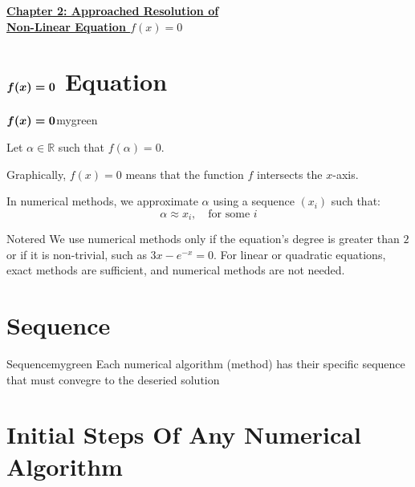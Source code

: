\newpage
\null

\begin{center}
    \Huge{\textbf{\underline{Chapter 2: Approached Resolution of}}} \\
    \vspace{0.25cm}
    \Huge{\textbf{\underline{Non-Linear Equation \( f(x) = 0 \)}}}
\end{center}

\setcounter{section}{0}

\vspace{0.35cm}
\section{\textbf{\protect\( \boldsymbol{f(x) = 0} \protect\)} Equation}

\begin{prettyBox}{\textbf{\protect\( \boldsymbol{f(x) = 0} \protect\)}}{mygreen}

Let \( \alpha \in \mathbb{R} \) such that \( f(\alpha) = 0 \).  

Graphically, \( f(x) = 0 \) means that the function \( f \) intersects the \( x \)-axis.  


In numerical methods, we approximate \( \alpha \) using a sequence \( (x_i) \) such that:  
\[
\alpha \approx x_i, \quad \text{for some } i
\]\end{prettyBox}


\vspace{0.35cm}


\begin{prettyBox}{Note}{red}
We use numerical methods only if the equation's degree is greater than \( 2 \)  
or if it is non-trivial, such as \( 3x - e^{-x} = 0 \).  
For linear or quadratic equations, exact methods are sufficient, and numerical methods are not needed.
\end{prettyBox}


\vspace{0.5cm}
\section{Sequence}
\begin{prettyBox}{Sequence}{mygreen}
Each numerical algorithm (method) has their specific sequence that must
convegre to the deseried solution
\end{prettyBox}

\vspace{0.5cm}
\section{Initial Steps Of Any Numerical Algorithm}

